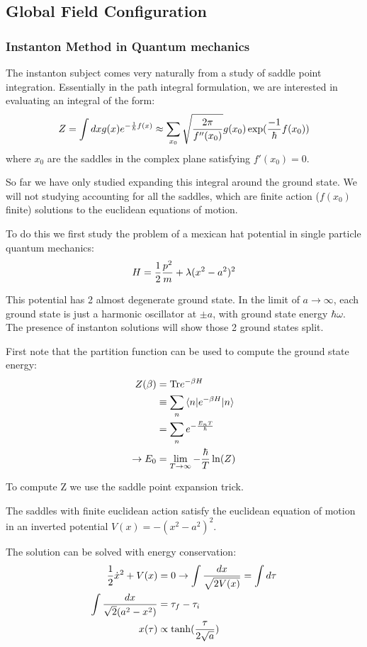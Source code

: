 \documentclass[11pt]{scrartcl}
\begin{document}
\subsection{Global Field Configuration}
\subsubsection{Instanton Method in Quantum mechanics}

The instanton subject comes very naturally from a study of saddle point integration.  Essentially in the path integral formulation, we are interested in evaluating an integral of the form:
\[ Z = \int dx g(x) e^{- {1 \over \hbar} f(x)} \approx \sum_{x_0} \sqrt{2 \pi \over f''(x_0)} g(x_0) \exp({- 1 \over \hbar} f(x_0)) \] 
where $x_0$ are the saddles in the complex plane satisfying $f'(x_0) = 0$.

So far we have only studied expanding this integral around the ground state.  We will not studying accounting for all the saddles, which are finite action ($f(x_0)$ finite) solutions to the euclidean equations of motion.

To do this we first study the problem of a mexican hat potential in single particle quantum mechanics:
\[H = \frac12 {p^2 \over m} + {\lambda} (x^2 - a^2)^2 \]

This potential has 2 almost degenerate ground state.  In the limit of $a \rightarrow \infty$, each ground state is just a harmonic oscillator at $\pm a$, with ground state energy $\hbar \omega$.  The presence of instanton solutions will show those 2 ground states split. 

First note that the partition function can be used to compute the ground state energy:
\begin{align}
	Z(\beta) &= \mathrm{Tr} e^{-\beta H} \\
	 & \equiv \sum_{n} \braket{n | e^{-\beta H} | n} \\
	 &= \sum_{n} e^{-{E_n T \over \hbar}}  \\
	 \rightarrow E_0 &= \lim_{T \rightarrow \infty} - {\hbar \over T} \ln(Z)
	\end{align}



To compute Z we use the saddle point expansion trick.

The saddles with finite euclidean action satisfy the euclidean equation of motion in an inverted potential $V(x) = - (x^2 - a^2)^2$.

The solution can be solved with energy conservation:
\begin{align}
	\frac12 \dot{x}^2 + V(x) &= 0 \rightarrow \int {dx \over \sqrt{2 V(x)}} = \int d\tau \\
	\int {dx \over \sqrt{2} (a^2 - x^2)} &= \tau_f - \tau_i \\
	x(\tau) & \propto \tanh( {\tau \over 2 \sqrt{a}} )
\end{align}
\end{document}

